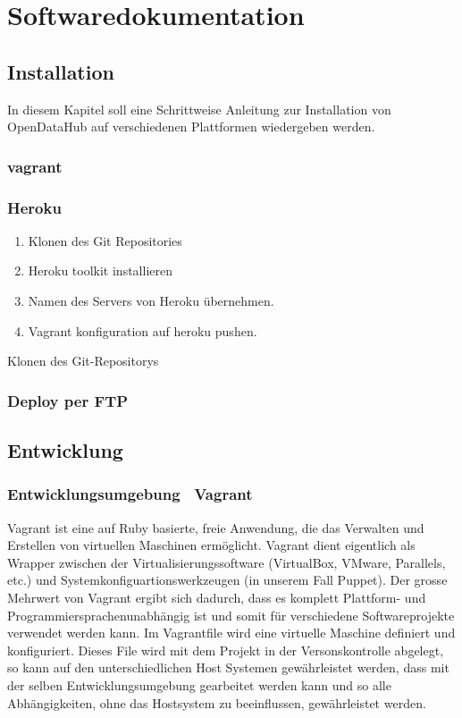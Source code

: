 \part{Softwaredokumentation}

\chapter{Installation}
In diesem Kapitel soll eine Schrittweise Anleitung zur Installation von OpenDataHub auf verschiedenen Plattformen wiedergeben werden.
\section{vagrant}
\section{Heroku}
\begin{enumerate}
\item Klonen des Git Repositories
\item Heroku toolkit installieren
\item Namen des Servers von Heroku übernehmen.
\item Vagrant konfiguration auf heroku pushen.
\end{enumerate}Klonen des Git-Repositorys

\section{Deploy per FTP}

\chapter{Entwicklung}

\section{Entwicklungsumgebung \textendash\ Vagrant}
Vagrant ist eine auf Ruby basierte, freie Anwendung, die das Verwalten und Erstellen von virtuellen Maschinen ermöglicht. Vagrant dient eigentlich als Wrapper zwischen der Virtualisierungssoftware (VirtualBox, VMware, Parallels, etc.) und Systemkonfiguartionswerkzeugen (in unserem Fall Puppet).
Der grosse Mehrwert von Vagrant ergibt sich dadurch, dass es komplett Plattform- und Programmiersprachenunabhängig ist und somit für verschiedene Softwareprojekte verwendet werden kann. Im Vagrantfile wird eine virtuelle Maschine definiert und konfiguriert. Dieses File wird mit dem Projekt in der Versonskontrolle abgelegt, so kann auf den unterschiedlichen Host Systemen gewährleistet werden, dass mit der selben Entwicklungsumgebung gearbeitet werden kann und so alle Abhängigkeiten, ohne das Hostsystem zu beeinflussen, gewährleistet werden.

